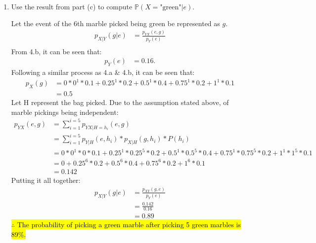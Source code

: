 \documentclass[11pt,onecolumn]{article}
\begin{document}
\begin{enumerate}
\begin{enumerate}
        \item Use the result from part (c) to compute $\mathbb{P}(X=\text{"green"} |e)$.
        \setlength{\parskip}{6pt}

        Let the event of the 6th marble picked being green be represented as $g$.
        \begin{equation}
            \begin{aligned}
                p_{X\vert Y}(g \vert e) & = \frac{p_{YX}(e, g)}{p_Y(e)} \\
            \end{aligned}
        \end{equation}
        From 4.b, it can be seen that:
        \begin{equation}
            \begin{aligned}
                p_{Y}(e) & = 0.16. 
            \end{aligned}
        \end{equation}
        Following a similar process as 4.a \& 4.b, it can be seen that:
        \begin{equation}
            \begin{aligned}
                p_{X}(g) & = 0*0^1*0.1 + 0.25^1*0.2 +  0.5^1*0.4 + 0.75^1*0.2 + 1^1*0.1 \\
                & = 0.5
            \end{aligned}
        \end{equation}
        Let H represent the bag picked. Due to the assumption stated above, of marble pickings being independent:
        \begin{equation}
            \begin{aligned}
                p_{YX}(e, g) & = \sum_{i=1}^{i=5}p_{YX \vert H=h_i}(e, g) \\
                & = \sum_{i=1}^{i=5}p_{Y \vert H}(e, h_i)*p_{X \vert H}(g, h_i)*P(h_i) \\
                & =  0*0^1*0*0.1 + 0.25^1*0.25^5*0.2 +  0.5^1*0.5^5*0.4 + 0.75^1*0.75^5*0.2 + 1^1*1^5*0.1 \\
                & =  0 + 0.25^6*0.2 +  0.5^6*0.4 + 0.75^6*0.2 + 1^6*0.1 \\
                & = 0.142
            \end{aligned}
        \end{equation}
        Putting it all together:
    \begin{equation}
        \begin{aligned}
            p_{X\vert Y}(g \vert e) & = \frac{p_{XY}(g,e)}{p_Y(e)} \\
            & = \frac{0.142}{0.16} \\
            & = 0.89
        \end{aligned}
    \end{equation}
    \hl{$\therefore$ The probability of picking a green marble after picking 5 green marbles is 89\%.}
    \end{enumerate}
    
\end{enumerate} 
\end{document}
